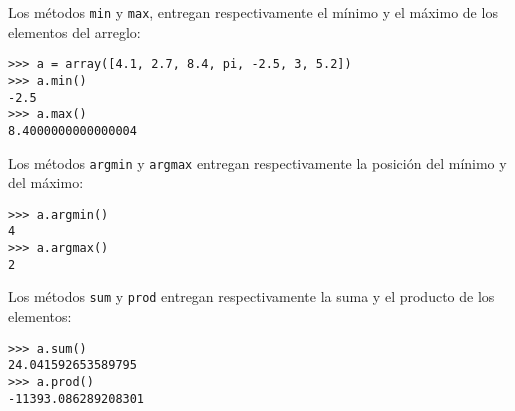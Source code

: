 Los métodos \lstinline!min! y \lstinline!max!, entregan respectivamente
el mínimo y el máximo de los elementos del arreglo:

\begin{lstlisting}
>>> a = array([4.1, 2.7, 8.4, pi, -2.5, 3, 5.2])
>>> a.min()
-2.5
>>> a.max()
8.4000000000000004
\end{lstlisting}

Los métodos \lstinline!argmin! y \lstinline!argmax! entregan
respectivamente la posición del mínimo y del máximo:

\begin{lstlisting}
>>> a.argmin()
4
>>> a.argmax()
2
\end{lstlisting}

Los métodos \lstinline[language={}]!sum! y \lstinline!prod! entregan respectivamente
la suma y el producto de los elementos:

\begin{lstlisting}[language={}]
>>> a.sum()
24.041592653589795
>>> a.prod()
-11393.086289208301
\end{lstlisting}

